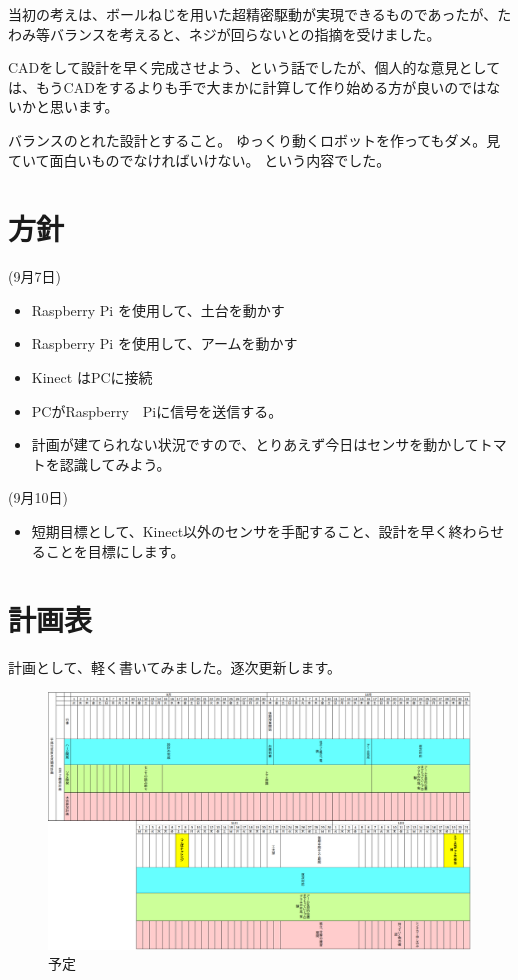 当初の考えは、ボールねじを用いた超精密駆動が実現できるものであったが、たわみ等バランスを考えると、ネジが回らないとの指摘を受けました。

CADをして設計を早く完成させよう、という話でしたが、個人的な意見としては、もうCADをするよりも手で大まかに計算して作り始める方が良いのではないかと思います。

バランスのとれた設計とすること。
ゆっくり動くロボットを作ってもダメ。見ていて面白いものでなければいけない。
という内容でした。

\section{方針}
(9月7日)
\begin{itemize}
\item Raspberry Pi を使用して、土台を動かす
\item Raspberry Pi を使用して、アームを動かす
\item Kinect はPCに接続
\item PCがRaspberry　Piに信号を送信する。
\item 計画が建てられない状況ですので、とりあえず今日はセンサを動かしてトマトを認識してみよう。
\end{itemize}

\par
(9月10日)
\begin{itemize}
\item 短期目標として、Kinect以外のセンサを手配すること、設計を早く終わらせることを目標にします。
\end{itemize}
\section{計画表}
計画として、軽く書いてみました。逐次更新します。

\begin{figure}[htbp]
\begin{center}
\includegraphics[width=25cm,angle=90]{../arc_plan.eps}
\end{center}
\caption{予定}
\end{figure}
